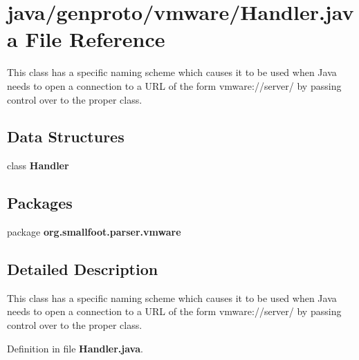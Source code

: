 \section{java/genproto/vmware/\+Handler.java File Reference}
\label{vmware_2Handler_8java}


This class has a specific naming scheme which causes it to be used when Java needs to open a connection to a U\+R\+L of the form vmware\+://server/ by passing control over to the proper class.  


\subsection*{Data Structures}
\begin{DoxyCompactItemize}
\item 
class {\bf Handler}
\end{DoxyCompactItemize}
\subsection*{Packages}
\begin{DoxyCompactItemize}
\item 
package {\bf org.\+smallfoot.\+parser.\+vmware}
\end{DoxyCompactItemize}


\subsection{Detailed Description}
This class has a specific naming scheme which causes it to be used when Java needs to open a connection to a U\+R\+L of the form vmware\+://server/ by passing control over to the proper class. 



Definition in file {\bf Handler.\+java}.

